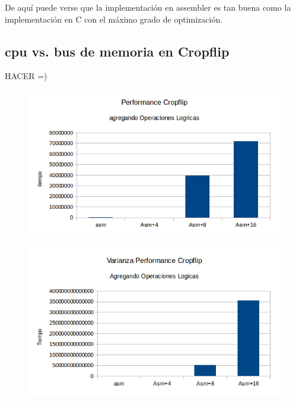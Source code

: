 \documentclass[a4paper]{article}
\begin{document}
De aquí puede verse que la implementación en assembler es tan buena como la implementación en C con el máximo grado de optimización.

\newpage

\subsection{cpu vs. bus de memoria en Cropflip}
HACER =)

\begin{figure}[h!]
  \begin{center}
  \includegraphics[scale=0.66]{Graficos1.5/crop/addsub/per.png}
  \label{nombreparareferenciar1}
  \end{center}
\end{figure}

\begin{figure}[h!]
  \begin{center}
  \includegraphics[scale=0.66]{Graficos1.5/crop/addsub/var.png}
  \label{nombreparareferenciar1}
  \end{center}
\end{figure}
\end{document}
